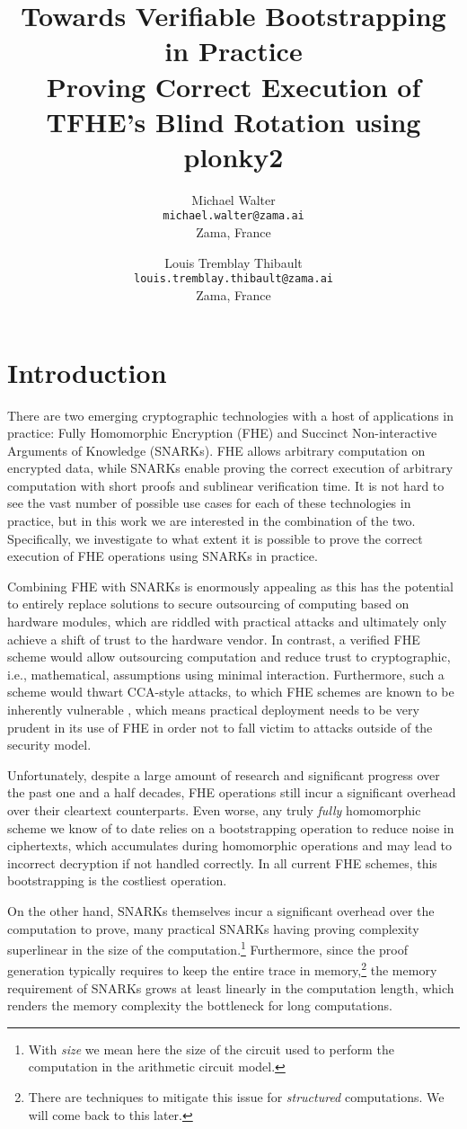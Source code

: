 \documentclass[9pt]{extarticle}
\title{Towards Verifiable Bootstrapping in Practice \\ \large{Proving Correct Execution of TFHE's Blind Rotation using plonky2}}
\author{Michael Walter\\
  \texttt{michael.walter@zama.ai}\\
  Zama, France
  \and
  Louis Tremblay Thibault\\
  \texttt{louis.tremblay.thibault@zama.ai}\\
  Zama, France
}
\date{}
\begin{document}
\maketitle


\section{Introduction}\label{sec:introduction}
There are two emerging cryptographic technologies with a host of applications in practice: Fully Homomorphic Encryption (FHE) and Succinct Non-interactive Arguments of Knowledge (SNARKs). FHE allows arbitrary computation on encrypted data, while SNARKs enable proving the correct execution of arbitrary computation with short proofs and sublinear verification time. It is not hard to see the vast number of possible use cases for each of these technologies in practice, but in this work we are interested in the combination of the two. Specifically, we investigate to what extent it is possible to prove the correct execution of FHE operations using SNARKs in practice.

Combining FHE with SNARKs is enormously appealing as this has the potential to entirely replace solutions to secure outsourcing of computing based on hardware modules, which are riddled with practical attacks and ultimately only achieve a shift of trust to the hardware vendor. In contrast, a verified FHE scheme would allow outsourcing computation and reduce trust to cryptographic, i.e., mathematical, assumptions using minimal interaction. Furthermore, such a scheme would thwart CCA-style attacks, to which FHE schemes are known to be inherently vulnerable \cite{EPRINT:ChiGamGou16}, which means practical deployment needs to be very prudent in its use of FHE in order not to fall victim to attacks outside of the security model.

Unfortunately, despite a large amount of research and significant progress over the past one and a half decades, FHE operations still incur a significant overhead over their cleartext counterparts. Even worse, any truly \emph{fully} homomorphic scheme we know of to date relies on a bootstrapping operation to reduce noise in ciphertexts, which accumulates during homomorphic operations and may lead to incorrect decryption if not handled correctly. In all current FHE schemes, this bootstrapping is the costliest operation.

On the other hand, SNARKs themselves incur a significant overhead over the computation to prove, many practical SNARKs having proving complexity superlinear in the size of the computation.\footnote{With \emph{size} we mean here the size of the circuit used to perform the computation in the arithmetic circuit model.} Furthermore, since the proof generation typically requires to keep the entire trace in memory,\footnote{There are techniques to mitigate this issue for \emph{structured} computations. We will come back to this later.} the memory requirement of SNARKs grows at least linearly in the computation length, which renders the memory complexity the bottleneck for long computations.
\end{document}
